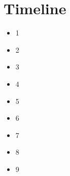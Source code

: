 \section{Timeline}
\label{sec:timeline}
\begin{itemize}

\item 1

\item 2

\item 3

\item 4

\item 5

\item 6

\item 7

\item 8

\item 9
\end{itemize}
